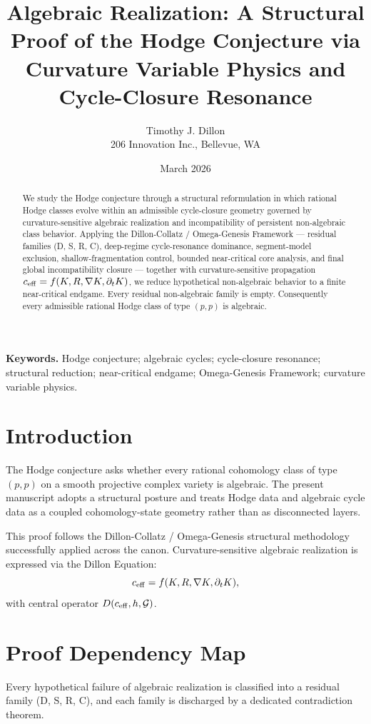 \documentclass[11pt,a4paper]{article}
\title{Algebraic Realization: A Structural Proof of the Hodge Conjecture via Curvature Variable Physics and Cycle-Closure Resonance}
\author{Timothy J. Dillon \\ 206 Innovation Inc., Bellevue, WA}
\date{March 2026}
\begin{document}
\maketitle

\begin{abstract}
We study the Hodge conjecture through a structural reformulation in which rational Hodge classes evolve within an admissible cycle-closure geometry governed by curvature-sensitive algebraic realization and incompatibility of persistent non-algebraic class behavior. Applying the Dillon-Collatz / Omega-Genesis Framework --- residual families (D, S, R, C), deep-regime cycle-resonance dominance, segment-model exclusion, shallow-fragmentation control, bounded near-critical core analysis, and final global incompatibility closure --- together with curvature-sensitive propagation \(c_{\rm eff} = f(K, R, \nabla K, \partial_t K)\), we reduce hypothetical non-algebraic behavior to a finite near-critical endgame. Every residual non-algebraic family is empty. Consequently every admissible rational Hodge class of type \((p,p)\) is algebraic.
\end{abstract}

\textbf{Keywords.} Hodge conjecture; algebraic cycles; cycle-closure resonance; structural reduction; near-critical endgame; Omega-Genesis Framework; curvature variable physics.

\section{Introduction}
The Hodge conjecture asks whether every rational cohomology class of type \((p,p)\) on a smooth projective complex variety is algebraic. The present manuscript adopts a structural posture and treats Hodge data and algebraic cycle data as a coupled cohomology-state geometry rather than as disconnected layers.

This proof follows the Dillon-Collatz / Omega-Genesis structural methodology successfully applied across the canon. Curvature-sensitive algebraic realization is expressed via the Dillon Equation:
\[
c_{\rm eff} = f(K, R, \nabla K, \partial_t K),
\]
with central operator \(D(c_{\rm eff}, h, \mathcal{G})\).

\section{Proof Dependency Map}
Every hypothetical failure of algebraic realization is classified into a residual family (D, S, R, C), and each family is discharged by a dedicated contradiction theorem.
\end{document}
